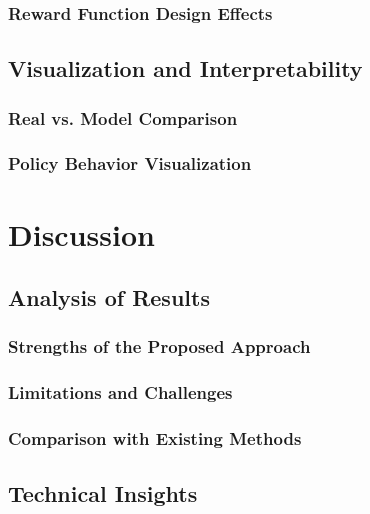\documentclass[
	english,
	ruledheaders=section,
	class=report,
	thesis={type=master},
	accentcolor=9c,
	custommargins=true,
	marginpar=false,
	parskip=half-,
	fontsize=11pt,
]{tudapub}
\begin{document}
\subsection{Reward Function Design Effects}
\label{subsec:reward_effects}

\section{Visualization and Interpretability}
\label{sec:visualization}

\subsection{Real vs. Model Comparison}
\label{subsec:real_vs_model}

\subsection{Policy Behavior Visualization}
\label{subsec:policy_visualization}

\chapter{Discussion}
\label{chap:discussion}

\section{Analysis of Results}
\label{sec:results_analysis}

\subsection{Strengths of the Proposed Approach}
\label{subsec:strengths}

\subsection{Limitations and Challenges}
\label{subsec:limitations_challenges}

\subsection{Comparison with Existing Methods}
\label{subsec:comparison}

\section{Technical Insights}
\label{sec:technical_insights}
\end{document}

